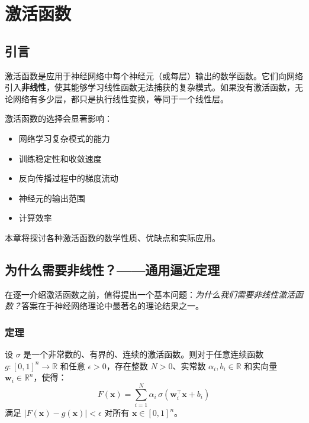 \clearpage
\cleardoublepage

\chapter{激活函数}

\section{引言}

激活函数是应用于神经网络中每个神经元（或每层）输出的数学函数。它们向网络引入\textbf{非线性}，使其能够学习线性函数无法捕获的复杂模式。如果没有激活函数，无论网络有多少层，都只是执行线性变换，等同于一个线性层。

激活函数的选择会显著影响：
\begin{itemize}
    \item 网络学习复杂模式的能力
    \item 训练稳定性和收敛速度
    \item 反向传播过程中的梯度流动
    \item 神经元的输出范围
    \item 计算效率
\end{itemize}

本章将探讨各种激活函数的数学性质、优缺点和实际应用。

\section{为什么需要非线性？——通用逼近定理}

在逐一介绍激活函数之前，值得提出一个基本问题：\emph{为什么我们需要非线性激活函数？}答案在于神经网络理论中最著名的理论结果之一。

\subsection{定理}

\begin{定理}
设 $\sigma$ 是一个非常数的、有界的、连续的激活函数。则对于任意连续函数 $g: [0,1]^n \to \mathbb{R}$ 和任意 $\epsilon > 0$，存在整数 $N > 0$、实常数 $\alpha_i, b_i \in \mathbb{R}$ 和实向量 $\mathbf{w}_i \in \mathbb{R}^n$，使得：
\begin{equation}
F(\mathbf{x}) = \sum_{i=1}^{N} \alpha_i \, \sigma\left(\mathbf{w}_i^\top \mathbf{x} + b_i\right)
\end{equation}
满足 $|F(\mathbf{x}) - g(\mathbf{x})| < \epsilon$ 对所有 $\mathbf{x} \in [0,1]^n$。
\end{定理}

